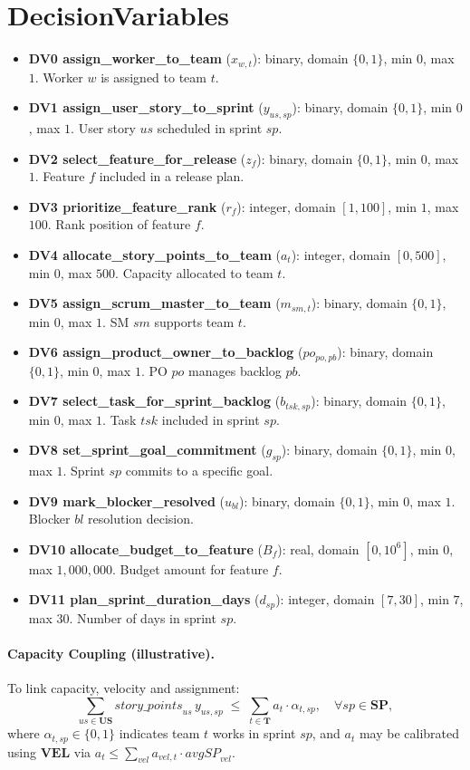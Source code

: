 \documentclass[11pt,a4paper]{article}
\begin{document}
\section{DecisionVariables}
\begin{itemize}[leftmargin=2em,itemsep=0.6em]
  \item \textbf{DV0 assign\_worker\_to\_team} ($x_{w,t}$): binary, domain $\{0,1\}$, min $0$, max $1$. Worker $w$ is assigned to team $t$.
  \item \textbf{DV1 assign\_user\_story\_to\_sprint} ($y_{us,sp}$): binary, domain $\{0,1\}$, min $0$, max $1$. User story $us$ scheduled in sprint $sp$.
  \item \textbf{DV2 select\_feature\_for\_release} ($z_f$): binary, domain $\{0,1\}$, min $0$, max $1$. Feature $f$ included in a release plan.
  \item \textbf{DV3 prioritize\_feature\_rank} ($r_f$): integer, domain $[1,100]$, min $1$, max $100$. Rank position of feature $f$.
  \item \textbf{DV4 allocate\_story\_points\_to\_team} ($a_t$): integer, domain $[0,500]$, min $0$, max $500$. Capacity allocated to team $t$.
  \item \textbf{DV5 assign\_scrum\_master\_to\_team} ($m_{sm,t}$): binary, domain $\{0,1\}$, min $0$, max $1$. SM $sm$ supports team $t$.
  \item \textbf{DV6 assign\_product\_owner\_to\_backlog} ($po_{po,pb}$): binary, domain $\{0,1\}$, min $0$, max $1$. PO $po$ manages backlog $pb$.
  \item \textbf{DV7 select\_task\_for\_sprint\_backlog} ($b_{tsk,sp}$): binary, domain $\{0,1\}$, min $0$, max $1$. Task $tsk$ included in sprint $sp$.
  \item \textbf{DV8 set\_sprint\_goal\_commitment} ($g_{sp}$): binary, domain $\{0,1\}$, min $0$, max $1$. Sprint $sp$ commits to a specific goal.
  \item \textbf{DV9 mark\_blocker\_resolved} ($u_{bl}$): binary, domain $\{0,1\}$, min $0$, max $1$. Blocker $bl$ resolution decision.
  \item \textbf{DV10 allocate\_budget\_to\_feature} ($B_f$): real, domain $[0,10^6]$, min $0$, max $1{,}000{,}000$. Budget amount for feature $f$.
  \item \textbf{DV11 plan\_sprint\_duration\_days} ($d_{sp}$): integer, domain $[7,30]$, min $7$, max $30$. Number of days in sprint $sp$.
\end{itemize}

\paragraph{Capacity Coupling (illustrative).}
To link capacity, velocity and assignment:
\[
\sum_{us \in \mathbf{US}} \textit{story\_points}_{us}\, y_{us,sp} \;\le\; \sum_{t \in \mathbf{T}} a_t \cdot \alpha_{t,sp}, 
\quad \forall sp \in \mathbf{SP},
\]
where $\alpha_{t,sp}\in\{0,1\}$ indicates team $t$ works in sprint $sp$, and $a_t$ may be calibrated using $\mathbf{VEL}$ via $a_t \le \sum_{vel} a_{vel,t}\cdot \textit{avgSP}_{vel}$.
\end{document}
